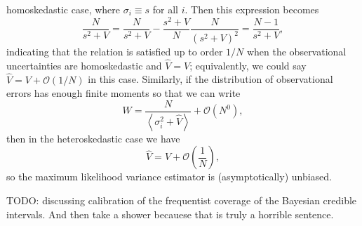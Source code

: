 \documentclass[modern]{aastex631}
\begin{document}
homoskedastic case, where $\sigma_i \equiv s$ for all $i$.  Then this expression
becomes 
\begin{equation}
    \frac{N}{s^2 + V} = \frac{N}{s^2 + V} - \frac{s^2 + V}{N}\frac{N}{\left( s^2 + V \right)^2} = \frac{N-1}{s^2 + V},
\end{equation}
indicating that the relation is satisfied up to order $1/N$ when the
observational uncertainties are homoskedastic and $\hat{V} = V$; equivalently,
we could say $\hat{V} = V + \mathcal{O}\left( 1/ N \right)$ in this case.
Similarly, if the distribution of observational errors has enough finite moments
so that we can write 
\begin{equation}
    W = \frac{N}{\left\langle \sigma_i^2 + \hat{V} \right\rangle} + \mathcal{O}\left( N^0 \right),
\end{equation}
then in the heteroskedastic case we have 
\begin{equation}
    \hat{V} = V + \mathcal{O}\left( \frac{1}{N} \right),
\end{equation}
so the maximum likelihood variance estimator is (asymptotically) unbiased.

TODO: discussing calibration of the frequentist coverage of the Bayesian
credible intervals.  And then take a shower becauese that is truly a horrible
sentence.


\end{document}
